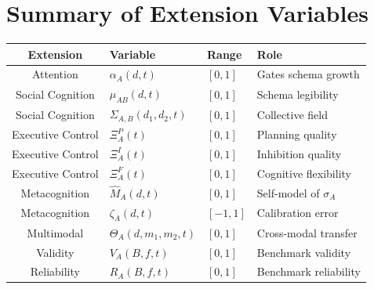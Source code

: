 \documentclass[11pt,a4paper]{article}
\begin{document}
\section{Summary of Extension Variables}\label{app:summary}

\begin{center}
\begin{tabular}{c l l l}
\toprule
\textbf{Extension} & \textbf{Variable} & \textbf{Range} & \textbf{Role} \\
\midrule
Attention & $\alpha_A(d,t)$ & $[0,1]$ & Gates schema growth \\
Social Cognition & $\mu_{AB}(d,t)$ & $[0,1]$ & Schema legibility \\
Social Cognition & $\Sigma_{A,B}(d_1,d_2,t)$ & $[0,1]$ & Collective field \\
Executive Control & $\Xi_A^P(t)$ & $[0,1]$ & Planning quality \\
Executive Control & $\Xi_A^I(t)$ & $[0,1]$ & Inhibition quality \\
Executive Control & $\Xi_A^F(t)$ & $[0,1]$ & Cognitive flexibility \\
Metacognition & $\hat{M}_A(d,t)$ & $[0,1]$ & Self-model of $\sigma_A$ \\
Metacognition & $\zeta_A(d,t)$ & $[-1,1]$ & Calibration error \\
Multimodal & $\Theta_A(d,m_1,m_2,t)$ & $[0,1]$ & Cross-modal transfer \\
Validity & $V_A(B,f,t)$ & $[0,1]$ & Benchmark validity \\
Reliability & $R_A(B,f,t)$ & $[0,1]$ & Benchmark reliability \\
\bottomrule
\end{tabular}
\end{center}



\end{document}
